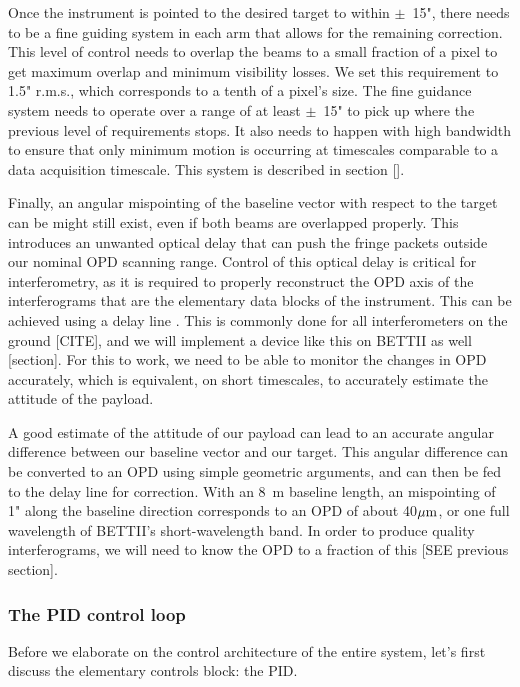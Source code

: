 Once the instrument is pointed to the desired target to within $\pm$~15", there needs to be a fine guiding system in each arm that allows for the remaining correction. This level of control needs to overlap the beams to a small fraction of a pixel to get maximum overlap and minimum visibility losses. We set this requirement to 1.5" r.m.s., which corresponds to a tenth of a pixel's size. The fine guidance system needs to operate over a range of at least $\pm$~15" to pick up where the previous level of requirements stops. It also needs to happen with high bandwidth to ensure that only minimum motion is occurring at timescales comparable to a data acquisition timescale. This system is described in section [].

Finally, an angular mispointing of the baseline vector with respect to the target can be might still exist, even if both beams are overlapped properly. This introduces an unwanted optical delay that can push the fringe packets outside our nominal OPD scanning range. Control of this optical delay is critical for interferometry, as it is required to properly reconstruct the OPD axis of the interferograms that are the elementary data blocks of the instrument. This can be achieved using a delay line . This is commonly done for all interferometers on the ground [CITE], and we will implement a device like this on BETTII as well [section]. For this to work, we need to be able to monitor the changes in OPD accurately, which is equivalent, on short timescales, to accurately estimate the attitude of the payload.

A good estimate of the attitude of our payload can lead to an accurate angular difference between our baseline vector and our target. This angular difference can be converted to an OPD using simple geometric arguments, and can then be fed to the delay line for correction. With an 8~m baseline length, an mispointing of 1" along the baseline direction corresponds to an OPD of about 40$\mu\textrm{m}$, or one full wavelength of BETTII's short-wavelength band. In order to produce quality interferograms, we will need to know the OPD to a fraction of this [SEE previous section]. 


\subsubsection{The PID control loop}

Before we elaborate on the control architecture of the entire system, let's first discuss the elementary controls block: the PID.

